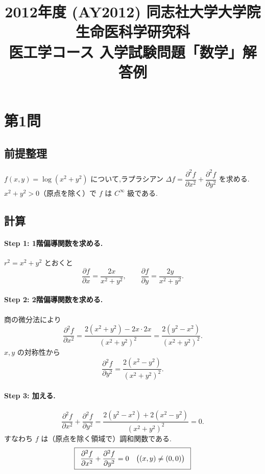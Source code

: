 \documentclass[11pt,a4paper]{article}
\title{2012年度 (AY2012) 同志社大学大学院 生命医科学研究科\\
医工学コース 入学試験問題「数学」解答例}
\author{}
\date{}
\begin{document}
\maketitle
\vspace{-3em}

\section*{第1問}

\subsection*{前提整理}

$f(x,y)=\log(x^2+y^2)$ について,ラプラシアン
$\Delta f=\dfrac{\partial^2 f}{\partial x^2}+\dfrac{\partial^2 f}{\partial y^2}$
を求める.$x^2+y^2>0$（原点を除く）で $f$ は $C^\infty$ 級である.

\subsection*{計算}

\paragraph{Step 1: 1階偏導関数を求める.}
$r^2=x^2+y^2$ とおくと
\[
\frac{\partial f}{\partial x}=\frac{2x}{x^2+y^2},\qquad
\frac{\partial f}{\partial y}=\frac{2y}{x^2+y^2}.
\]

\paragraph{Step 2: 2階偏導関数を求める.}
商の微分法により
\[
\frac{\partial^2 f}{\partial x^2}
=\frac{2(x^2+y^2)-2x\cdot 2x}{(x^2+y^2)^2}
=\frac{2(y^2-x^2)}{(x^2+y^2)^2}.
\]
$x,y$ の対称性から
\[
\frac{\partial^2 f}{\partial y^2}
=\frac{2(x^2-y^2)}{(x^2+y^2)^2}.
\]

\paragraph{Step 3: 加える.}
\[
\frac{\partial^2 f}{\partial x^2}+\frac{\partial^2 f}{\partial y^2}
=\frac{2(y^2-x^2)+2(x^2-y^2)}{(x^2+y^2)^2}=0.
\]
すなわち $f$ は（原点を除く領域で）調和関数である.
\[
\boxed{\,\
\displaystyle\frac{\partial^2 f}{\partial x^2}+\frac{\partial^2 f}{\partial y^2}=0
\quad\bigl((x,y)\neq(0,0)\bigr)\ \,}
\]
\end{document}
